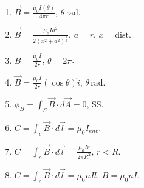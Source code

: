 \documentclass[12pt, letterpaper]{report}
\begin{document}
\begin{multicols*}{3}
\begin{enumerate}
    \item $\vec{B} = \frac{\mu_0 I(\theta)}{4\pi r}$, $\theta \, \text{rad}$.
    \item $\vec{B} = \frac{\mu_0 I a^2}{2(x^2 + a^2)^{\frac{3}{2}}}$, $a = r$, $x = \text{dist}$.
    \item $B = \frac{\mu_0 I}{2r}$, $\theta = 2\pi$.
    \item $\vec{B} = \frac{\mu_0 I}{2r}(\cos{\theta}) \hat{i}$, $\theta \, \text{rad}$.
    \item $\phi_B = \int_S \vec{B} \cdot d\vec{A} = 0$, SS.
    \item $C = \int_c \vec{B} \cdot d\vec{l} = \mu_0 I_{enc}$.
    \item $C = \int_c \vec{B} \cdot d\vec{l} = \frac{\mu_0 Ir}{2\pi R^2}$, $r < R$.
    \item $C = \int_c \vec{B} \cdot d\vec{l} = \mu_0 n I l$, $B = \mu_0 n I$.
\end{enumerate}
\end{multicols*}
\end{document}
